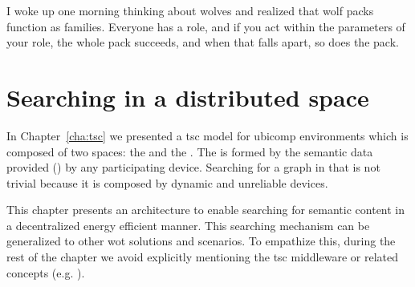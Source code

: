 
\begin{savequote}[50mm]
I woke up one morning thinking about wolves and realized that wolf packs function as families.
Everyone has a role, and if you act within the parameters of your role, the whole pack succeeds, and when that falls apart, so does the pack.
\end{savequote}


\chapter{Searching in a distributed space}
\label{cha:searching}


\newcommand{\Space}{\emph{Space}} %
\newcommand{\Spaces}{\emph{Spaces}} %
\newcommand{\consumer}{\emph{Consumer}}
\newcommand{\consumers}{\emph{Consumers}}
\newcommand{\provider}{\emph{Provider}}
\newcommand{\providers}{\emph{Providers}}
\newcommand{\clue}{\emph{clue}}
\newcommand{\clues}{\emph{clues}}


\ifpdf
    \graphicspath{{\pathchapfive/figures/PNG/}{\pathchapfive/figures/PDF/}{\pathchapfive/figures/}}
\else
    \graphicspath{{\pathchapfive/figures/EPS/}{\pathchapfive/figures/}}
\fi



In Chapter~\ref{cha:tsc} we presented a \ac{tsc} model for \ac{ubicomp} environments which is composed of two spaces: the \coordspace{} and the \outerspace{}.
The \outerspace{} is formed by the semantic data provided (\selfgraphs{}) by any participating device.
Searching for a graph in that \outerspace{} is not trivial because it is composed by dynamic and unreliable devices.

This chapter presents an architecture to enable searching for semantic content in a decentralized energy efficient manner.
This searching mechanism can be generalized to other \ac{wot} solutions and scenarios.
To empathize this, during the rest of the chapter we avoid explicitly mentioning the \ac{tsc} middleware or related concepts (e.g. \outerspace{}).



